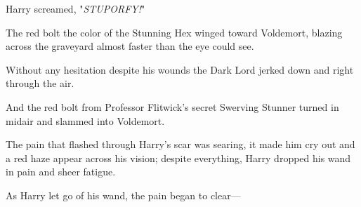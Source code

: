 Harry screamed, "\emph{STUPORFY!}"

The red bolt the color of the Stunning Hex winged toward Voldemort, blazing
across the graveyard almost faster than the eye could see.

Without any hesitation despite his wounds the Dark Lord jerked down and right
through the air.

And the red bolt from Professor Flitwick's secret Swerving Stunner turned in
midair and slammed into Voldemort.

The pain that flashed through Harry's scar was searing, it made him cry out and
a red haze appear across his vision; despite everything, Harry dropped his wand
in pain and sheer fatigue.

As Harry let go of his wand, the pain began to clear---
